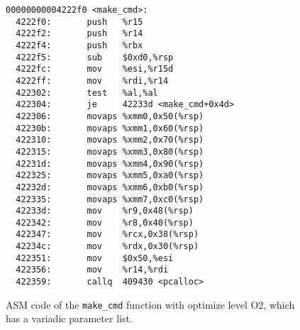 \begin{figure}
\centering
\begin{center}
 \begin{lstlisting}[basicstyle=\footnotesize]
00000000004222f0 <make_cmd>:
  4222f0:       push   %r15
  4222f2:       push   %r14
  4222f4:       push   %rbx
  4222f5:       sub    $0xd0,%rsp
  4222fc:       mov    %esi,%r15d
  4222ff:       mov    %rdi,%r14
  422302:       test   %al,%al
  422304:       je     42233d <make_cmd+0x4d>
  422306:       movaps %xmm0,0x50(%rsp)
  42230b:       movaps %xmm1,0x60(%rsp)
  422310:       movaps %xmm2,0x70(%rsp)
  422315:       movaps %xmm3,0x80(%rsp)
  42231d:       movaps %xmm4,0x90(%rsp)
  422325:       movaps %xmm5,0xa0(%rsp)
  42232d:       movaps %xmm6,0xb0(%rsp)
  422335:       movaps %xmm7,0xc0(%rsp)
  42233d:       mov    %r9,0x48(%rsp)
  422342:       mov    %r8,0x40(%rsp)
  422347:       mov    %rcx,0x38(%rsp)
  42234c:       mov    %rdx,0x30(%rsp)
  422351:       mov    $0x50,%esi
  422356:       mov    %r14,%rdi
  422359:       callq  409430 <pcalloc>
\end{lstlisting}
\end{center}

\caption{ASM code of the \texttt{make\_cmd} function with optimize level O2, which has a variadic parameter list.}
\label{fig:asmvariadic}
\end{figure}

